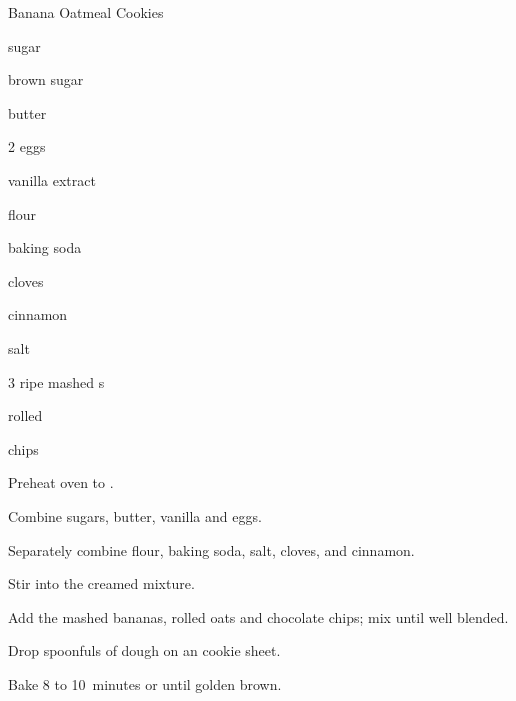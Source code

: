 \begin{recipe}{Banana Oatmeal Cookies}{}{}

\begin{ingredients}
\item \C{\half} sugar
\item \C{\half} brown sugar
\item {} butter
\item 2 eggs
\item {} vanilla extract
\item {} flour
\item {} baking soda
\item \tp{\half} cloves
\item {} cinnamon
\item \tp{\eighth} salt
\item 3 ripe mashed s
\item {} rolled 
\item {}  chips
\end{ingredients}

\begin{directions}
\item Preheat oven to .
\item Combine sugars, butter, vanilla and eggs.
\item Separately combine flour, baking soda, salt, cloves, and cinnamon.
\item Stir into the creamed mixture.
\item Add the mashed bananas, rolled oats and chocolate chips; mix until well blended.
\item Drop spoonfuls of dough on an cookie sheet.
\item Bake 8 to 10~minutes or until golden brown.
\end{directions}
\end{recipe}

